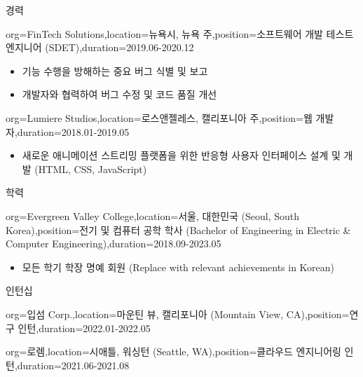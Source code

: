 \documentclass{resume}
\begin{document}
\begin{ResumeSection}{경력}
\begin{ResumeSubsection}{org=FinTech Solutions,location={뉴욕시, 뉴욕 주},position={소프트웨어 개발 테스트 엔지니어 (SDET)},duration={2019.06-2020.12}}
\begin{itemize}
            \item 기능 수행을 방해하는 중요 버그 식별 및 보고  %
            \item 개발자와 협력하여 버그 수정 및 코드 품질 개선  %
        \end{itemize}
    \end{ResumeSubsection}
    \begin{ResumeSubsection}{org=Lumiere Studios,location={로스앤젤레스, 캘리포니아 주},position={웹 개발자},duration={2018.01-2019.05}}
        \begin{itemize}
            \item 새로운 애니메이션 스트리밍 플랫폼을 위한 반응형 사용자 인터페이스 설계 및 개발 (HTML, CSS, JavaScript)  %
        \end{itemize}
    \end{ResumeSubsection}
\end{ResumeSection}

\begin{ResumeSection}{학력}
    \begin{ResumeSubsection}{org={Evergreen Valley College},location={서울, 대한민국 (Seoul, South Korea)},position={전기 및 컴퓨터 공학 학사 (Bachelor of Engineering in Electric \& Computer Engineering)},duration={2018.09-2023.05}}
        \begin{itemize}
            \item 모든 학기 학장 명예 회원 (Replace with relevant achievements in Korean)
        \end{itemize}
    \end{ResumeSubsection}
\end{ResumeSection}

\begin{ResumeSection}{인턴십}

 \begin{ResumeSubsection}{org={입섬 Corp.},location={마운틴 뷰, 캘리포니아 (Mountain View, CA)},position={연구 인턴},duration={2022.01-2022.05}}
 \end{ResumeSubsection}

 \begin{ResumeSubsection}{org={로렘},location={시애틀, 워싱턴 (Seattle, WA)},position={클라우드 엔지니어링 인턴},duration={2021.06-2021.08}}
 \end{ResumeSubsection}

\end{ResumeSection}
\end{document}

